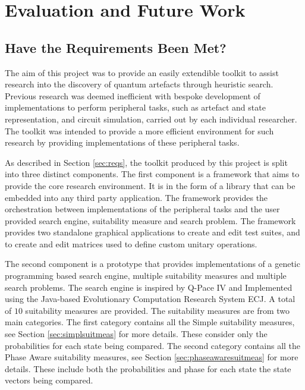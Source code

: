 \chapter{Evaluation and Future Work}
\label{sec:evalandfutwork}

\section{Have the Requirements Been Met?}

The aim of this project was to provide an easily extendible toolkit to assist research into the discovery of quantum artefacts through heuristic search.
Previous research was deemed inefficient with bespoke development of implementations to perform peripheral tasks, such as artefact and state representation, and circuit simulation, carried out by each individual researcher.
The toolkit was intended to provide a more efficient environment for such research by providing implementations of these peripheral tasks.

As described in Section \ref{sec:reqs}, the toolkit produced by this project is split into three distinct components.
The first component is a framework that aims to provide the core research environment.
It is in the form of a library that can be embedded into any third party application.
The framework provides the orchestration between implementations of the peripheral tasks and the user provided search engine, suitability measure and search problem.
The framework provides two standalone graphical applications to create and edit test suites, and to create and edit matrices used to define custom unitary operations.

The second component is a prototype that provides implementations of a genetic programming based search engine, multiple suitability measures and multiple search problems.
The search engine is inspired by Q-Pace IV\cite{masseythesis} and Implemented using the Java-based Evolutionary Computation Research System ECJ\cite{ecjtool}.
A total of $10$ suitability measures are provided.
The suitability measures are from two main categories.
The first category contains all the Simple suitability measures, see Section \ref{sec:simplsuitmeas} for more details.
These consider only the probabilities for each state being compared.
The second category contains all the Phase Aware suitability measures, see Section \ref{sec:phaseawaresuitmeas} for more details.
These include both the probabilities and phase for each state the state vectors being compared.

